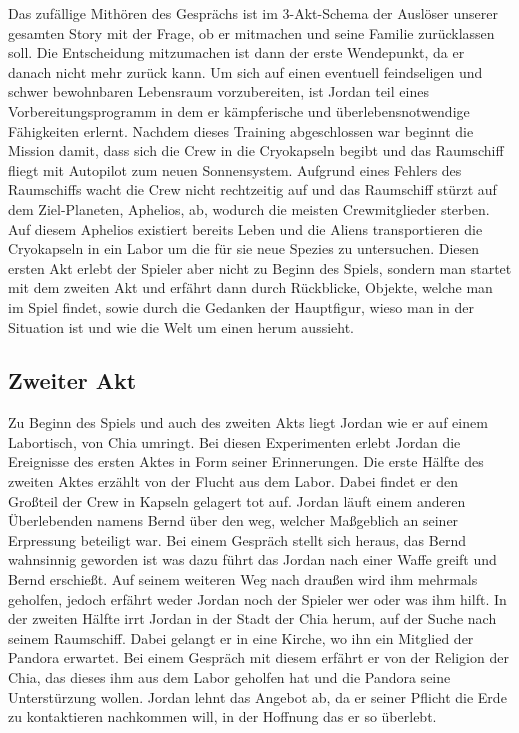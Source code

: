 \documentclass[12pt]{article}
\begin{document}
	Das zufällige Mithören des Gesprächs ist im 3-Akt-Schema der Auslöser unserer gesamten Story mit der Frage, ob er mitmachen und seine Familie zurücklassen soll. Die Entscheidung mitzumachen ist dann der erste Wendepunkt, da er danach nicht mehr zurück kann.\newline 
	Um sich auf einen eventuell feindseligen und schwer bewohnbaren Lebensraum vorzubereiten, ist Jordan teil eines Vorbereitungsprogramm in dem er kämpferische und überlebensnotwendige Fähigkeiten erlernt.\newline 
	Nachdem dieses Training abgeschlossen war beginnt die Mission damit, dass sich die Crew in die Cryokapseln begibt und das Raumschiff fliegt mit Autopilot zum neuen Sonnensystem. Aufgrund eines Fehlers des Raumschiffs wacht die Crew nicht rechtzeitig auf und das Raumschiff stürzt auf dem Ziel-Planeten, Aphelios, ab, wodurch die meisten Crewmitglieder sterben. Auf diesem Aphelios existiert bereits Leben und die Aliens transportieren die Cryokapseln in ein Labor um die für sie neue Spezies zu untersuchen.\newline
	Diesen ersten Akt erlebt der Spieler aber nicht zu Beginn des Spiels, sondern man startet mit dem zweiten Akt und erfährt dann durch Rückblicke, Objekte, welche man im Spiel findet, sowie durch die Gedanken der Hauptfigur, wieso man in der Situation ist und wie die Welt um einen herum aussieht.\newline
	\subsection{Zweiter Akt}
	Zu Beginn des Spiels und auch des zweiten Akts liegt Jordan wie er auf einem Labortisch, von Chia umringt. Bei diesen Experimenten erlebt Jordan die Ereignisse des ersten Aktes in Form seiner Erinnerungen.\newline
	Die erste Hälfte des zweiten Aktes erzählt von der Flucht aus dem Labor. Dabei findet er den Großteil der Crew in Kapseln gelagert tot auf. Jordan läuft einem anderen Überlebenden namens Bernd über den weg, welcher Maßgeblich an seiner Erpressung beteiligt war. Bei einem Gespräch stellt sich heraus, das Bernd wahnsinnig geworden ist was dazu führt das Jordan nach einer Waffe greift und Bernd erschießt. Auf seinem weiteren Weg nach draußen wird ihm mehrmals geholfen, jedoch erfährt weder Jordan noch der Spieler wer oder was ihm hilft.\newline
	In der zweiten Hälfte irrt Jordan in der Stadt der Chia herum, auf der Suche nach seinem Raumschiff. Dabei gelangt er in eine Kirche, wo ihn ein Mitglied der Pandora erwartet. Bei einem Gespräch mit diesem erfährt er von der Religion der Chia, das dieses ihm aus dem Labor geholfen hat und die Pandora seine Unterstürzung wollen. Jordan lehnt das Angebot ab, da er seiner Pflicht die Erde zu kontaktieren nachkommen will, in der Hoffnung das er so überlebt.\newline
\end{document}

